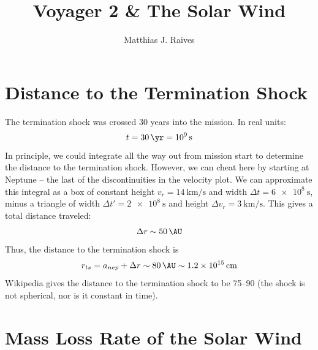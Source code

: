 \documentclass{article}
\title{Voyager 2 \& The Solar Wind}
\author{Matthias J. Raives}
\begin{document}
	
	\maketitle
	
	\section{Distance to the Termination Shock}
		The termination shock was crossed 30 years into the mission.  In real units:
		\begin{equation}
			t = \SI{30}{\yr} = \SI{e9}{\second}
		\end{equation}
		In principle, we could integrate all the way out from mission start to determine the distance to the termination shock.  However, we can cheat here by starting at Neptune -- the last of the discontinuities in the velocity plot.  We can approximate this integral as a box of constant height $v_{r}=\SI{14}{\km\per\second}$ and width $\Delta t=\SI{6e8}{\second}$, minus a triangle of width $\Delta t'=\SI{2e8}{\second}$ and height $\Delta v_{r} = \SI{3}{\km\per\second}$.  This gives a total distance traveled:
		\begin{equation}
			\Delta r \sim \SI{50}{\AU}
		\end{equation}
		Thus, the distance to the termination shock is
		\begin{equation}
			r_{ts} = a_{nep} + \Delta r \sim \SI{80}{\AU} \sim \SI{1.2e15}{\cm}
		\end{equation}
		Wikipedia gives the distance to the termination shock to be \SIrange{75}{90}{\AU} (the shock is not spherical, nor is it constant in time).
	
	\section{Mass Loss Rate of the Solar Wind}
	
\end{document}
